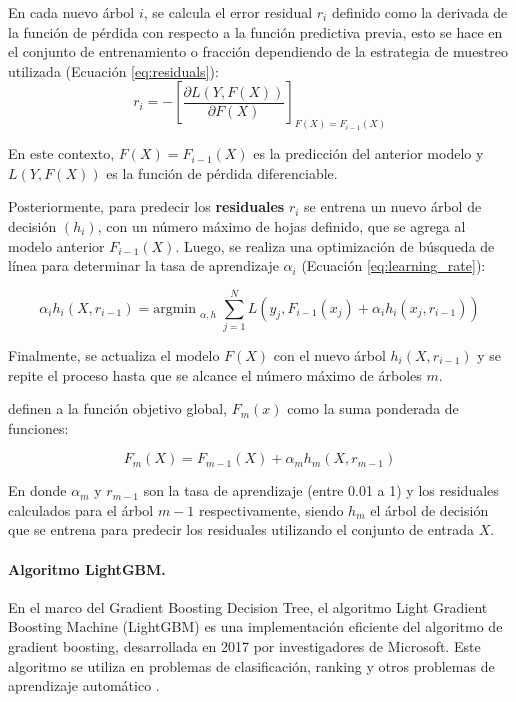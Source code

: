 En cada nuevo árbol $i$, se calcula el error residual $r_{i}$ definido como la derivada de la función de pérdida con respecto a la función predictiva previa, esto se hace en el 
conjunto de entrenamiento o fracción dependiendo de la estrategia de muestreo utilizada (Ecuación \ref{eq:residuals}):
\begin{equation}
    r_{i} = -\left[\frac{\partial L(Y, F(X))}{\partial F(X)}\right]_{F(X)=F_{i-1}(X)}
    \label{eq:residuals}
\end{equation}

En este contexto, $F(X) = F_{i-1}(X)$ es la predicción del anterior modelo y $L(Y, F(X))$ es la función de pérdida diferenciable. 

Posteriormente, para predecir los \textbf{residuales} $r_{i}$ se entrena un nuevo árbol de decisión $(h_i)$, con un número máximo de hojas definido, que se agrega al modelo anterior $F_{i-1}(X)$.
Luego, se realiza una optimización de búsqueda de línea para determinar la tasa de aprendizaje $\alpha_i$ (Ecuación \ref{eq:learning_rate}): 

\begin{equation}
    \alpha_i h_{i}(X,r_{i-1}) = \text{argmin}_{\substack{\alpha, h}} \sum_{j=1}^N L(y_j, F_{i-1}(x_j) + \alpha_i h_i(x_j, r_{i-1}))
    \label{eq:learning_rate}
\end{equation}

Finalmente, se actualiza el modelo $F(X)$ con el nuevo árbol $h_i(X, r_{i-1})$ y se repite el proceso hasta que se alcance el número máximo de árboles $m$. 

\citet{mienye_survey_2022} definen a la función objetivo global, 
$F_{m}(x)$ como la suma ponderada de funciones:

\begin{equation}
    F_m(X) = F_{m-1}(X) + \alpha_m h_m(X, r_{m-1})
    \label{eq:funcion_objetivo}
\end{equation}

En donde $\alpha_m$ y $r_{m-1}$ son la tasa de aprendizaje (entre 0.01 a 1) y los residuales calculados para el árbol $m-1$ respectivamente, siendo $h_m$ el árbol de decisión que se entrena para predecir los 
residuales utilizando el conjunto de entrada $X$.

\paragraph{Algoritmo LightGBM.}
En el marco del Gradient Boosting Decision Tree, el algoritmo Light Gradient Boosting Machine (LightGBM) es una implementación eficiente del algoritmo de gradient boosting, desarrollada en 2017 
por investigadores de Microsoft. Este algoritmo se utiliza en problemas de clasificación, ranking y otros problemas de aprendizaje automático \citep{sun_forest_2022}.

